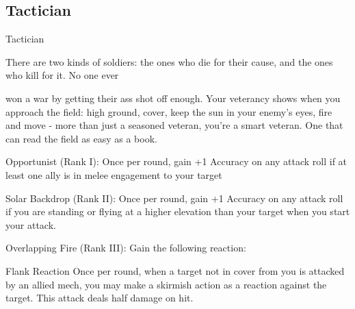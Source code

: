 \subsection{Tactician}

                                                   Tactician

There are two kinds of soldiers: the ones who die for their cause, and the ones who kill for it. No one ever

won a war by getting their ass shot off enough. Your veterancy shows when you approach the field: high
ground, cover, keep the sun in your enemy’s eyes, fire and move - more than just a seasoned veteran,
you’re a smart veteran. One that can read the field as easy as a book.


Opportunist (Rank I): Once per round, gain +1 Accuracy on any attack roll if at least one ally is
in melee engagement to your target

Solar Backdrop (Rank II): Once per round, gain +1 Accuracy on any attack roll if you are
standing or flying at a higher elevation than your target when you start your attack.

Overlapping Fire (Rank III): Gain the following reaction:





	        Flank
         Reaction
         Once per round, when a target not in cover from you is attacked by an allied mech, you
         may make a skirmish action as a reaction against the target. This attack deals half
         damage on hit.